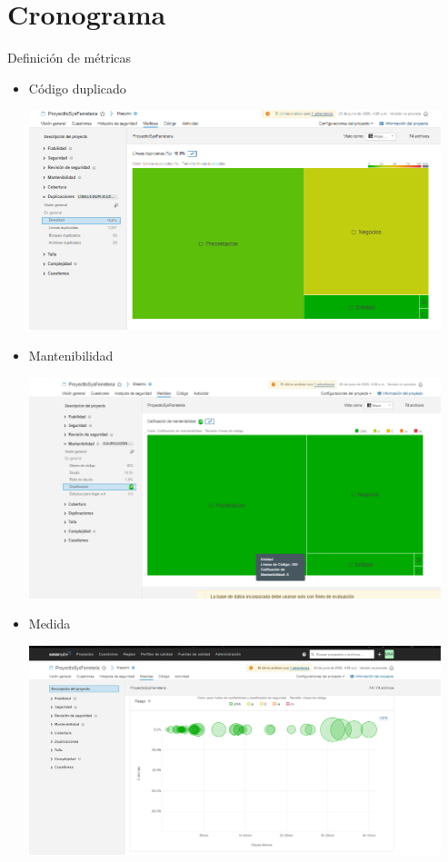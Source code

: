 \documentclass[preprint,12pt]{elsarticle}
\begin{document}
\section{Cronograma }
	Definición de métricas\cite{refaquino1}
	\begin{itemize}
	    \item Código duplicado
	\begin{center}
	\includegraphics[width=12cm]{./imagen/8} 
	\end{center}
	\item Mantenibilidad
		\begin{center}
	\includegraphics[width=12cm]{./imagen/9} 
	\end{center}
	\item Medida
		\begin{center}
	\includegraphics[width=12cm]{./imagen/10} 
	\end{center}
	\end{itemize}
	\newpage
	
		


\end{document}
